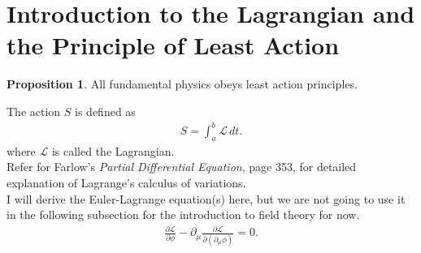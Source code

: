 \documentclass[a4paper,11pt]{article}
\numberwithin{equation}{section}
\theoremstyle{definition}
\newtheorem{prop}{Proposition}[section]
\begin{document}
\newpage

\tableofcontents

\newpage
\section{Introduction to the Lagrangian and the Principle of Least Action}
\begin{prop}
	All fundamental physics obeys least action principles.
\end{prop}
The action $S$ is defined as
\begin{align}
S = \int_{a}^{b}\mathcal{L}\,dt.
\end{align}
where $\mathcal{L}$ is called the Lagrangian.\\

Refer for Farlow's \textit{Partial Differential Equation}, page 353, for detailed explanation of Lagrange's calculus of variations.\\

I will derive the Euler-Lagrange equation(s) here, but we are not going to use it in the following subsection for the introduction to field theory for now. \\
\begin{align}
\frac{\partial \mathcal{L}}{\partial \phi} - \partial_\mu\frac{\partial \mathcal{L}}{\partial(\partial_\mu \phi)} = 0.
\end{align}
\end{document}
